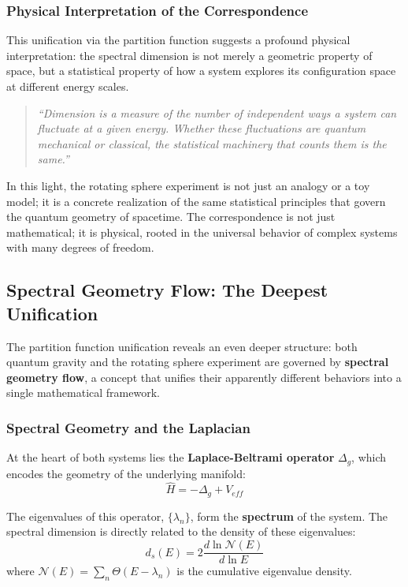 \documentclass[UTF8]{ctex}\n\documentclass[12pt,a4paper]{article}
\begin{document}
\subsubsection{Physical Interpretation of the Correspondence}

This unification via the partition function suggests a profound physical interpretation: the spectral dimension is not merely a geometric property of space, but a statistical property of how a system explores its configuration space at different energy scales.

\begin{quote}
    \textit{``Dimension is a measure of the number of independent ways a system can fluctuate at a given energy. Whether these fluctuations are quantum mechanical or classical, the statistical machinery that counts them is the same.''}
\end{quote}

In this light, the rotating sphere experiment is not just an analogy or a toy model; it is a concrete realization of the same statistical principles that govern the quantum geometry of spacetime. The correspondence is not just mathematical; it is physical, rooted in the universal behavior of complex systems with many degrees of freedom.

\subsection{Spectral Geometry Flow: The Deepest Unification}

The partition function unification reveals an even deeper structure: both quantum gravity and the rotating sphere experiment are governed by \textbf{spectral geometry flow}, a concept that unifies their apparently different behaviors into a single mathematical framework.

\subsubsection{Spectral Geometry and the Laplacian}

At the heart of both systems lies the \textbf{Laplace-Beltrami operator} $\Delta_g$, which encodes the geometry of the underlying manifold:
\begin{equation}
    \hat{H} = -\Delta_g + V_{eff}
\end{equation}

The eigenvalues of this operator, $\{\lambda_n\}$, form the \textbf{spectrum} of the system. The spectral dimension is directly related to the density of these eigenvalues:
\begin{equation}
    d_s(E) = 2 \frac{d \ln \mathcal{N}(E)}{d \ln E}
\end{equation}
where $\mathcal{N}(E) = \sum_n \Theta(E - \lambda_n)$ is the cumulative eigenvalue density.
\end{document}

